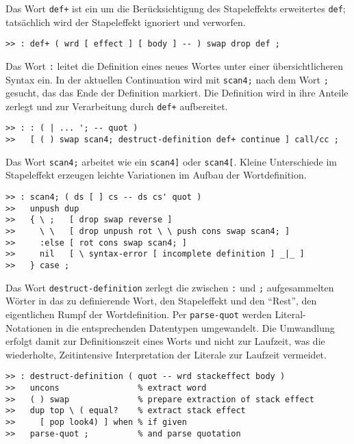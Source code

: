 Das Wort \verb|def+| ist ein um die Berücksichtigung des Stapeleffekts erweitertes \verb|def|; tatsächlich wird der Stapeleffekt ignoriert und verworfen.

\begin{verbatim}      
>> : def+ ( wrd [ effect ] [ body ] -- ) swap drop def ;
\end{verbatim}

Das Wort \verb|:| leitet die Definition eines neues Wortes unter einer über\-sicht\-lich\-er\-en Syntax ein. In der aktuellen Continuation wird mit \verb|scan4;| nach dem Wort \verb|;| gesucht, das das Ende der Definition markiert. Die Definition wird in ihre Anteile zerlegt und zur Verarbeitung durch \verb|def+| aufbereitet.

\begin{verbatim}
>> : : ( | ... '; -- quot ) 
>>   [ ( ) swap scan4; destruct-definition def+ continue ] call/cc ;
\end{verbatim}

Das Wort \verb|scan4;| arbeitet wie ein \verb|scan4]| oder \verb|scan4[|. Kleine Unterschiede im Stapeleffekt erzeugen leichte Variationen im Aufbau der Wortdefinition.

\begin{verbatim}
>> : scan4; ( ds [ ] cs -- ds cs' quot )
>>   unpush dup
>>   { \ ;   [ drop swap reverse ]
>>     \ \   [ drop unpush rot \ \ push cons swap scan4; ]
>>     :else [ rot cons swap scan4; ]
>>     nil   [ \ syntax-error [ incomplete definition ] _|_ ]
>>   } case ;
\end{verbatim}

Das Wort \verb|destruct-definition| zerlegt die zwischen \verb|:| und \verb|;| aufgesammelten Wörter in das zu definierende Wort, den Stapeleffekt und den "`Rest"', den eigentlichen Rumpf der Wortdefinition. Per \verb|parse-quot| werden Literal-Notationen in die entsprechenden Datentypen umgewandelt. Die Umwandlung erfolgt damit zur Definitionszeit eines Worts und nicht zur Laufzeit, was die wiederholte, Zeitintensive Interpretation der Literale zur Laufzeit vermeidet.

\begin{verbatim}  
>> : destruct-definition ( quot -- wrd stackeffect body ) 
>>   uncons                % extract word
>>   ( ) swap              % prepare extraction of stack effect
>>   dup top \ ( equal?    % extract stack effect
>>     [ pop look4) ] when % if given
>>   parse-quot ;          % and parse quotation
\end{verbatim}

